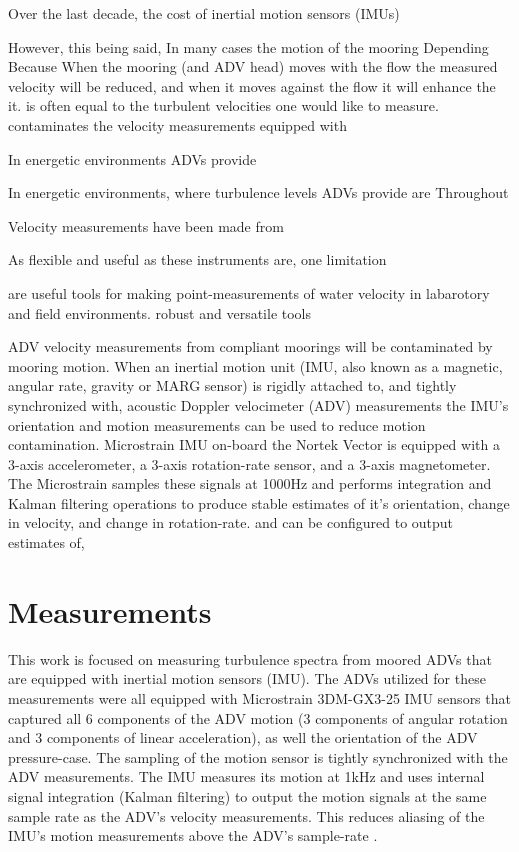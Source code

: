 \documentclass[twocol]{ametsoc}
\begin{document}
Over the last decade, the cost of inertial motion sensors (IMUs)

However, this being said,  In many cases the motion of the mooring Depending Because When the mooring (and ADV head) moves with the flow the measured velocity will be reduced, and when it moves against the flow it will enhance the it. is often equal to the turbulent velocities one would like to measure. contaminates the velocity measurements  equipped with 

In energetic environments ADVs provide 

In energetic environments, where turbulence levels ADVs provide are Throughout 

Velocity measurements have been made from 

As flexible and useful as these instruments are, one limitation 

are useful tools for making point-measurements of water velocity in labarotory and field environments. 
robust and versatile tools 

  ADV velocity measurements from compliant moorings will be contaminated by mooring motion. When an inertial motion unit (IMU, also known as a magnetic, angular rate, gravity or MARG sensor) is rigidly attached to, and tightly synchronized with, acoustic Doppler velocimeter (ADV) measurements the IMU's orientation and motion measurements can be used to reduce motion contamination.  Microstrain IMU on-board the Nortek Vector is equipped with a 3-axis accelerometer, a 3-axis rotation-rate sensor, and a 3-axis magnetometer.  The Microstrain samples these signals at 1000Hz and performs integration and Kalman filtering operations to produce stable estimates of it's orientation, change in velocity, and change in rotation-rate.  and  can be configured to output estimates of,

\section{Measurements}

This work is focused on measuring turbulence spectra from moored ADVs that are equipped with inertial motion sensors (IMU). The ADVs utilized for these measurements were all equipped with Microstrain 3DM-GX3-25 IMU sensors that captured all 6 components of the ADV motion (3 components of angular rotation and 3 components of linear acceleration), as well the orientation of the ADV pressure-case. The sampling of the motion sensor is tightly synchronized with the ADV measurements. The IMU measures its motion at 1kHz and uses internal signal integration (Kalman filtering) to output the motion signals at the same sample rate as the ADV's velocity measurements. This reduces aliasing of the IMU's motion measurements above the ADV's sample-rate \cite{3DM-GX3_coning_sculling}.
\end{document}
